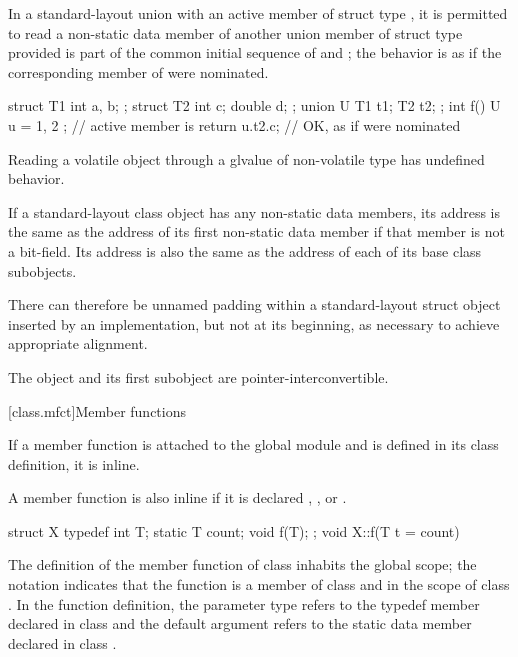 \pnum
In a standard-layout union with an active member
of struct type , it is permitted to read a non-static
data member  of another union member of struct type 
provided  is part of the common initial sequence of  and ;
the behavior is as if the corresponding member of  were nominated.
\begin{example}
\begin{codeblock}
struct T1 { int a, b; };
struct T2 { int c; double d; };
union U { T1 t1; T2 t2; };
int f() {
  U u = { { 1, 2 } };   // active member is 
  return u.t2.c;        // OK, as if  were nominated
}
\end{codeblock}
\end{example}
\begin{note}
Reading a volatile object through a glvalue of non-volatile type has
undefined behavior.
\end{note}

\pnum
If a standard-layout class object has any non-static data members, its address
is the same as the address of its first non-static data member
if that member is not a bit-field. Its
address is also the same as the address of each of its base class subobjects.
\begin{note}
There can therefore be unnamed padding within a standard-layout struct object
inserted by an implementation, but
not at its beginning, as necessary to achieve appropriate alignment.
\end{note}
\begin{note}
The object and its first subobject are
pointer-interconvertible.
\end{note}

[class.mfct]{Member functions}%

\pnum
{}%
%
If a member function is attached to the global module and is defined in its class definition,
it is inline.
\begin{note}
A member function is also inline if it is declared
, , or .
\end{note}

\pnum
{}%
\begin{example}
\begin{codeblock}
struct X {
  typedef int T;
  static T count;
  void f(T);
};
void X::f(T t = count) { }
\end{codeblock}

The definition of the member function  of class  inhabits the global
scope; the notation  indicates that the function 
is a member of class  and in the scope of class . In
the function definition, the parameter type  refers to the
typedef member  declared in class  and the default
argument  refers to the static data member 
declared in class .
\end{example}

